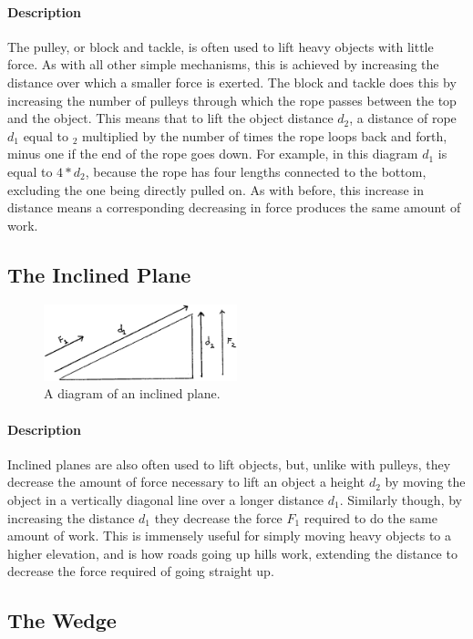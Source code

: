 \documentclass[12pt]{article}
\begin{document}
	\paragraph{Description}
	The pulley, or block and tackle, is often used to lift heavy objects with little force. As with all other simple mechanisms, this is achieved by increasing the distance over which a smaller force is exerted. The block and tackle does this by increasing the number of pulleys through which the rope passes between the top and the object. This means that to lift the object distance $d_2$, a distance of rope $d_1$ equal to $_2$ multiplied by the number of times the rope loops back and forth, minus one if the end of the rope goes down. For example, in this diagram $d_1$ is equal to $4 * d_2$, because the rope has four lengths connected to the bottom, excluding the one being directly pulled on. As with before, this increase in distance means a corresponding decreasing in force produces the same amount of work.
			
	\subsection{The Inclined Plane}
	\begin{figure}[H]
		\centerline{\includegraphics[width=0.5\textwidth]{images/plane.EPS}}
		\caption{A diagram of an inclined plane.}
	\end{figure}
	
	\paragraph{Description}
	Inclined planes are also often used to lift objects, but, unlike with pulleys, they decrease the amount of force necessary to lift an object a height $d_2$ by moving the object in a vertically diagonal line over a longer distance $d_1$. Similarly though, by increasing the distance $d_1$ they decrease the force $F_1$ required to do the same amount of work. This is immensely useful for simply moving heavy objects to a higher elevation, and is how roads going up hills work, extending the distance to decrease the force required of going straight up.
	
	\subsection{The Wedge}
	
\end{document}
